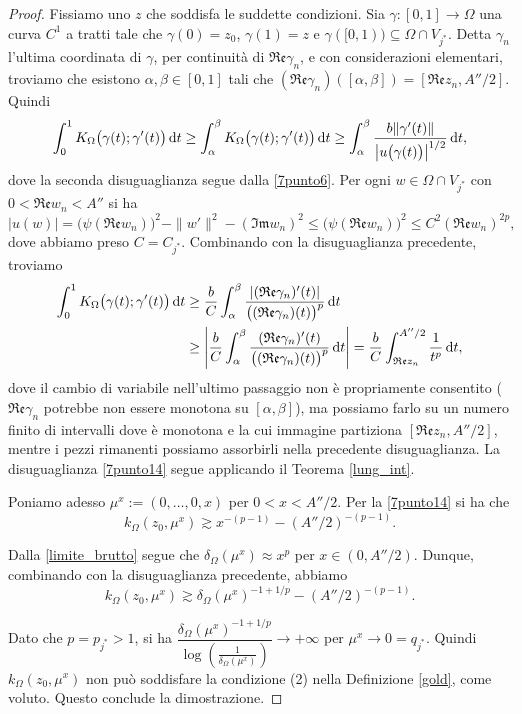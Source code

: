 \begin{proof}
    Fissiamo uno $z$ che soddisfa le suddette condizioni. Sia $\gamma:[0,1]\longrightarrow\Omega$ una curva $C^1$ a tratti tale che $\gamma(0)=z_0$, $\gamma(1)=z$ e $\gamma([0,1))\subseteq\Omega\cap V_{j^*}$. Detta $\gamma_n$ l'ultima coordinata di $\gamma$, per continuità di $\mathfrak{Re}\gamma_n$, e con considerazioni elementari, troviamo che esistono $\alpha,\beta\in[0,1]$ tali che $(\mathfrak{Re}\gamma_n)([\alpha,\beta])=[\mathfrak{Re}z_n,A''/2]$. Quindi
    $$\int_0^1 K_\Omega\big(\gamma(t);\gamma'(t)\big)\mathop{}\!\mathrm{d} t\ge\int_\alpha^\beta K_\Omega\big(\gamma(t);\gamma'(t)\big)\mathop{}\!\mathrm{d} t\ge \int_\alpha^\beta \frac{b\|\gamma'(t)\|}{\left|u\big(\gamma(t)\big)\right|^{1/2}}\mathop{}\!\mathrm{d} t,$$
    dove la seconda disuguaglianza segue dalla \eqref{7punto6}. Per ogni $w\in\Omega\cap V_{j^*}$ con $0<\mathfrak{Re}w_n<A''$ si ha
    $$|u(w)|=\big(\psi(\mathfrak{Re}w_n)\big)^2-\|w'\|^2-(\mathfrak{Im}w_n)^2 \le \big(\psi(\mathfrak{Re}w_n)\big)^2 \le C^2(\mathfrak{Re}w_n)^{2p},$$
    dove abbiamo preso $C=C_{j^*}$. Combinando con la disuguaglianza precedente, troviamo
    \begin{align*}
        \int_0^1 K_\Omega\big(\gamma(t);\gamma'(t)\big)\mathop{}\!\mathrm{d} t&\ge \frac{b}{C}\int_\alpha^\beta \frac{|(\mathfrak{Re}\gamma_n)'(t)|}{\big((\mathfrak{Re}\gamma_n)(t)\big)^p}\mathop{}\!\mathrm{d} t\\
        &\ge \left|\frac{b}{C}\int_\alpha^\beta \frac{(\mathfrak{Re}\gamma_n)'(t)}{\big((\mathfrak{Re}\gamma_n)(t)\big)^p}\mathop{}\!\mathrm{d} t\right|=\frac{b}{C}\int_{\mathfrak{Re}z_n}^{A''/2}\frac{1}{t^p}\mathop{}\!\mathrm{d} t,
    \end{align*}
    dove il cambio di variabile nell'ultimo passaggio non è propriamente consentito ($\mathfrak{Re}\gamma_n$ potrebbe non essere monotona su $[\alpha,\beta]$), ma possiamo farlo su un numero finito di intervalli dove è monotona e la cui immagine partiziona $[\mathfrak{Re}z_n,A''/2]$, mentre i pezzi rimanenti possiamo assorbirli nella precedente disuguaglianza. La disuguaglianza \eqref{7punto14} segue applicando il Teorema \ref{lung_int}.

    Poniamo adesso $\mu^x:=(0,\dots,0,x)$ per $0<x<A''/2$. Per la \eqref{7punto14} si ha che
    $$k_\Omega(z_0,\mu^x) \gtrsim x^{-(p-1)}-(A''/2)^{-(p-1)}.$$
    
    Dalla \eqref{limite_brutto} segue che $\delta_\Omega(\mu^x) \approx x^p$ per $x\in(0,A''/2)$. Dunque, combinando con la disuguaglianza precedente, abbiamo
    $$k_\Omega(z_0,\mu^x) \gtrsim \delta_\Omega(\mu^x)^{-1+1/p}-(A''/2)^{-(p-1)}.$$

    Dato che $p=p_{j^*}>1$, si ha $\dfrac{\delta_\Omega(\mu^x)^{-1+1/p}}{\log\left(\frac{1}{\delta_\Omega(\mu^x)}\right)}\longrightarrow +\infty$ per $\mu^x\longrightarrow 0=q_{j^*}$. Quindi $k_\Omega(z_0,\mu^x)$ non può soddisfare la condizione (2) nella Definizione \ref{gold}, come voluto. Questo conclude la dimostrazione.
\end{proof}